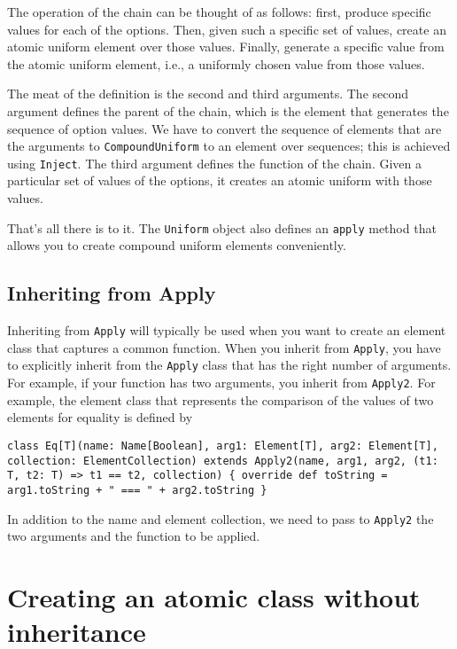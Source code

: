 The operation of the chain can be thought of as follows: first, produce specific values for each of the options. Then, given such a specific set of values, create an atomic uniform element over those values. Finally, generate a specific value from the atomic uniform element, i.e., a uniformly chosen value from
those values.

The meat of the definition is the second and third arguments. The second argument defines the parent of the chain, which is the element that generates the sequence of option values. We have to convert the sequence of elements that are the arguments to \texttt{CompoundUniform} to an element over sequences; this is achieved using \texttt{Inject}. The third argument defines the function of the chain. Given a particular set of values of the options, it creates an atomic uniform with those values.

That's all there is to it. The \texttt{Uniform} object also defines an \texttt{apply} method that allows you to create compound uniform elements conveniently.

\subsection{Inheriting from Apply}

Inheriting from \texttt{Apply} will typically be used when you want to create an element class that captures a common function. When you inherit from \texttt{Apply}, you have to explicitly inherit from the \texttt{Apply} class that has the right number of arguments. For example, if your function has two arguments, you inherit from \texttt{Apply2}. For example, the element class that represents the comparison of the values of two elements for equality is defined by

\begin{flushleft}
\texttt{class Eq[T](name: Name[Boolean], arg1: Element[T], arg2: Element[T], \newline collection: ElementCollection) extends Apply2(name, arg1, arg2, (t1: T, t2: T) => t1 == t2, collection) \{
\newline \tab override def toString = arg1.toString + " === " + arg2.toString
\newline \}
}
\end{flushleft}

In addition to the name and element collection, we need to pass to \texttt{Apply2} the two arguments and the function to be applied.

\section{Creating an atomic class without inheritance}

